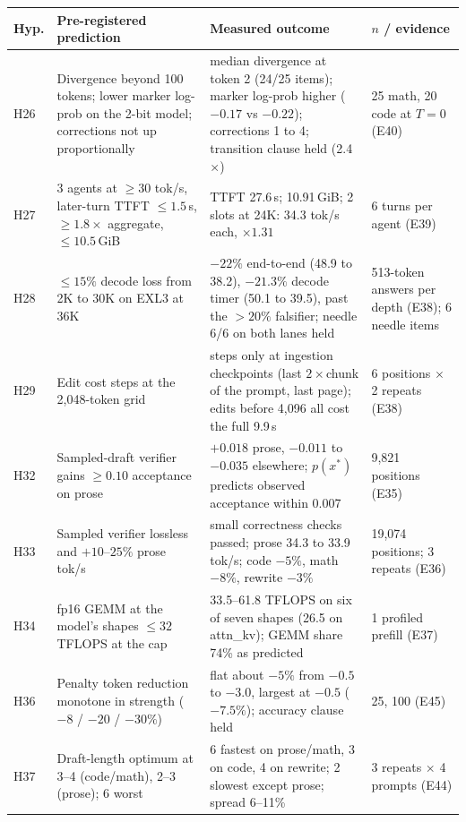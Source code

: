 \documentclass[11pt]{article}
\begin{document}
\begin{table}[p]
\ContinuedFloat
\centering
\scriptsize
\renewcommand{\arraystretch}{1.0}
\setlength{\tabcolsep}{2pt}
\fontsize{8pt}{9pt}\selectfont
\begin{tabular}{L{0.85cm}L{5.0cm}L{6.95cm}L{3.05cm}}
\toprule
Hyp. & Pre-registered prediction & Measured outcome & $n$ / evidence \\
\midrule
H26 & Divergence beyond 100 tokens; lower marker log-prob on the 2-bit model; corrections not up proportionally & median divergence at token 2 (24/25 items); marker log-prob higher ($-0.17$ vs $-0.22$); corrections 1 to 4; transition clause held (2.4$\times$) & 25 math, 20 code at $T{=}0$ (E40) \\
H27 & 3 agents at $\ge30$ tok/s, later-turn TTFT $\le1.5$\,s, $\ge1.8\times$ aggregate, $\le10.5$\,GiB & TTFT 27.6\,s; 10.91\,GiB; 2 slots at 24K: 34.3 tok/s each, $\times1.31$ & 6 turns per agent (E39) \\
H28 & $\le15\%$ decode loss from 2K to 30K on EXL3 at 36K & $-22\%$ end-to-end (48.9 to 38.2), $-21.3\%$ decode timer (50.1 to 39.5), past the $>20\%$ falsifier; needle 6/6 on both lanes held & 513-token answers per depth (E38); 6 needle items \\
H29 & Edit cost steps at the 2,048-token grid & steps only at ingestion checkpoints (last $2\times$chunk of the prompt, last page); edits before 4,096 all cost the full 9.9\,s & 6 positions $\times$ 2 repeats (E38) \\
H32 & Sampled-draft verifier gains $\ge0.10$ acceptance on prose & $+0.018$ prose, $-0.011$ to $-0.035$ elsewhere; $p(x^*)$ predicts observed acceptance within 0.007 & 9,821 positions (E35) \\
H33 & Sampled verifier lossless and $+10$--$25\%$ prose tok/s & small correctness checks passed; prose 34.3 to 33.9 tok/s; code $-5\%$, math $-8\%$, rewrite $-3\%$ & 19,074 positions; 3 repeats (E36) \\
H34 & fp16 GEMM at the model's shapes $\le32$ TFLOPS at the cap & 33.5--61.8 TFLOPS on six of seven shapes (26.5 on attn\_kv); GEMM share 74\% as predicted & 1 profiled prefill (E37) \\
H36 & Penalty token reduction monotone in strength ($-8$ / $-20$ / $-30\%$) & flat about $-5\%$ from $-0.5$ to $-3.0$, largest at $-0.5$ ($-7.5\%$); accuracy clause held & 25, 100 (E45) \\
H37 & Draft-length optimum at 3--4 (code/math), 2--3 (prose); 6 worst & 6 fastest on prose/math, 3 on code, 4 on rewrite; 2 slowest except prose; spread 6--11\% & 3 repeats $\times$ 4 prompts (E44) \\

\end{tabular}
\end{table}
\end{document}
